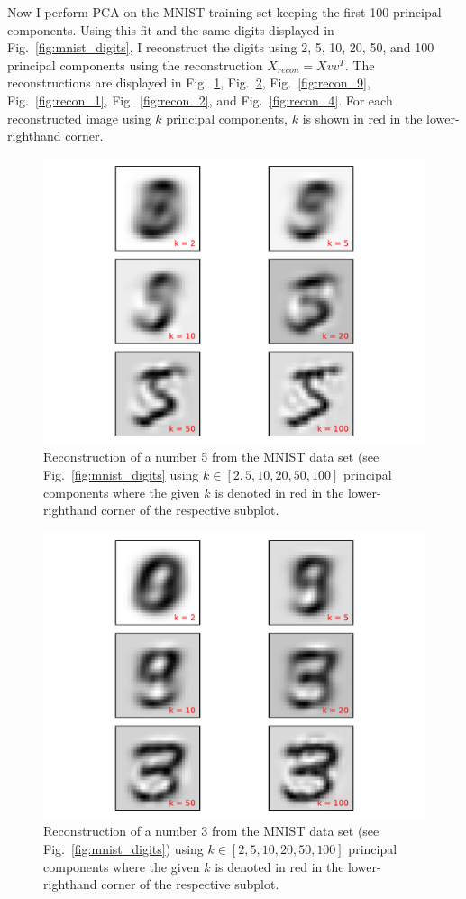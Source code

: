 \documentclass[12pt]{amsart}
\begin{document}
Now I perform PCA on the MNIST training set keeping the first 100 principal components.  Using this fit and the same digits displayed in Fig.~\ref{fig:mnist_digits}, I reconstruct the digits using 2, 5, 10, 20, 50, and 100 principal components using the reconstruction $X_{recon} = Xvv^T$.  The reconstructions are displayed in Fig.~\ref{fig:recon_5}, Fig.~\ref{fig:recon_3}, Fig.~\ref{fig:recon_9}, Fig.~\ref{fig:recon_1}, Fig.~\ref{fig:recon_2}, and Fig.~\ref{fig:recon_4}.  For each reconstructed image using $k$ principal components, $k$ is shown in red in the lower-righthand corner.
\begin{figure}[!ht]
	\includegraphics[width=\columnwidth]{5_recon_mnist.pdf}
    \caption{Reconstruction of a number 5 from the MNIST data set (see Fig.~\ref{fig:mnist_digits} using $k \in [2,5,10,20,50,100]$ principal components where the given $k$ is denoted in red in the lower-righthand corner of the respective subplot.}
    \label{fig:recon_5}
\end{figure}
\begin{figure}[H]
	\includegraphics[width=\columnwidth]{3_recon_mnist.pdf}
    \caption{Reconstruction of a number 3 from the MNIST data set (see Fig.~\ref{fig:mnist_digits}) using $k \in [2,5,10,20,50,100]$ principal components where the given $k$ is denoted in red in the lower-righthand corner of the respective subplot.}
    \label{fig:recon_3}
\end{figure}
\end{document}
